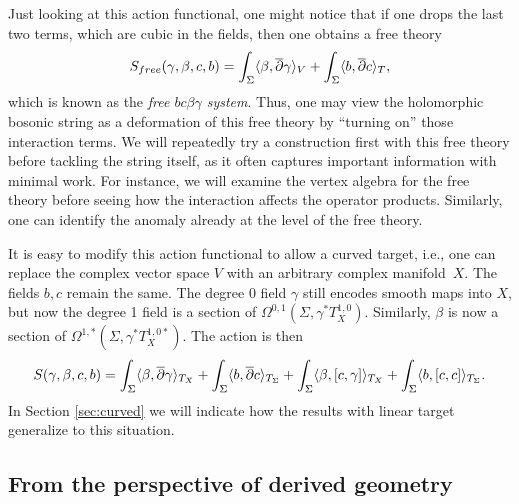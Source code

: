 

\begin{rmk}
\label{rmk:bcbg}
Just looking at this action functional, one might notice that if one drops the last two terms,
which are cubic in the fields, then one obtains a free theory
\begin{equation}
S_{free}(\gamma,\beta,c,b) = 
\int_\Sigma \langle \beta, \overline{\partial} \gamma \rangle_V 
+ \int_\Sigma \langle b, \overline{\partial} c \rangle_T,
\end{equation}
which is known as the {\em free $bc\beta\gamma$ system}.
Thus, one may view the holomorphic bosonic string as a deformation of this free theory
by ``turning on'' those interaction terms.
We will repeatedly try a construction first with this free theory before tackling the string itself,
as it often captures important information with minimal work.
For instance, we will examine the vertex algebra for the free theory before seeing how the interaction affects the operator products.
Similarly, one can identify the anomaly already at the level of the free theory.
\end{rmk}

\begin{rmk}
\label{rmk:curved}
It is easy to modify this action functional to allow a curved target,
i.e., one can replace the complex vector space $V$ with an arbitrary complex manifold~$X$. 
The fields $b,c$ remain the same.
The degree 0 field $\gamma$ still encodes smooth maps into $X$, but now the degree 1 field is a section of $\Omega^{0,1}(\Sigma, \gamma^*T^{1,0}_X)$.
Similarly, $\beta$ is now a section of $\Omega^{1,*}(\Sigma, \gamma^*T^{1,0*}_X)$.
The action is then
\begin{equation}
S(\gamma,\beta,c,b) = 
\int_\Sigma \langle \beta, \overline{\partial} \gamma \rangle_{T_X}
+ \int_\Sigma \langle b, \overline{\partial} c \rangle_{T_\Sigma} 
+ \int_\Sigma \langle \beta, [c,\gamma] \rangle_{T_X}
+ \int_\Sigma \langle b, [c,c] \rangle_{T_\Sigma}.
\end{equation}
In Section \ref{sec:curved} we will indicate how the results with linear target generalize to this situation.
\end{rmk}

\subsection{From the perspective of derived geometry}

